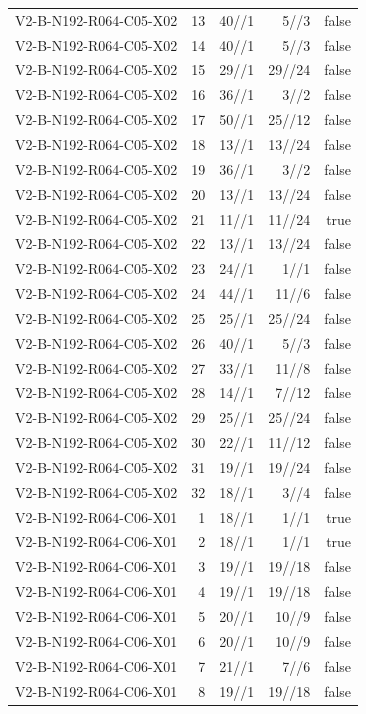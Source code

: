 {\begin{longtable}{lrrrr}
V2-B-N192-R064-C05-X02 & 13 & 40//1 & 5//3 & false \\
V2-B-N192-R064-C05-X02 & 14 & 40//1 & 5//3 & false \\
V2-B-N192-R064-C05-X02 & 15 & 29//1 & 29//24 & false \\
V2-B-N192-R064-C05-X02 & 16 & 36//1 & 3//2 & false \\
V2-B-N192-R064-C05-X02 & 17 & 50//1 & 25//12 & false \\
V2-B-N192-R064-C05-X02 & 18 & 13//1 & 13//24 & false \\
V2-B-N192-R064-C05-X02 & 19 & 36//1 & 3//2 & false \\
V2-B-N192-R064-C05-X02 & 20 & 13//1 & 13//24 & false \\
V2-B-N192-R064-C05-X02 & 21 & 11//1 & 11//24 & true \\
V2-B-N192-R064-C05-X02 & 22 & 13//1 & 13//24 & false \\
V2-B-N192-R064-C05-X02 & 23 & 24//1 & 1//1 & false \\
V2-B-N192-R064-C05-X02 & 24 & 44//1 & 11//6 & false \\
V2-B-N192-R064-C05-X02 & 25 & 25//1 & 25//24 & false \\
V2-B-N192-R064-C05-X02 & 26 & 40//1 & 5//3 & false \\
V2-B-N192-R064-C05-X02 & 27 & 33//1 & 11//8 & false \\
V2-B-N192-R064-C05-X02 & 28 & 14//1 & 7//12 & false \\
V2-B-N192-R064-C05-X02 & 29 & 25//1 & 25//24 & false \\
V2-B-N192-R064-C05-X02 & 30 & 22//1 & 11//12 & false \\
V2-B-N192-R064-C05-X02 & 31 & 19//1 & 19//24 & false \\
V2-B-N192-R064-C05-X02 & 32 & 18//1 & 3//4 & false \\
V2-B-N192-R064-C06-X01 & 1 & 18//1 & 1//1 & true \\
V2-B-N192-R064-C06-X01 & 2 & 18//1 & 1//1 & true \\
V2-B-N192-R064-C06-X01 & 3 & 19//1 & 19//18 & false \\
V2-B-N192-R064-C06-X01 & 4 & 19//1 & 19//18 & false \\
V2-B-N192-R064-C06-X01 & 5 & 20//1 & 10//9 & false \\
V2-B-N192-R064-C06-X01 & 6 & 20//1 & 10//9 & false \\
V2-B-N192-R064-C06-X01 & 7 & 21//1 & 7//6 & false \\
V2-B-N192-R064-C06-X01 & 8 & 19//1 & 19//18 & false \\

\end{longtable}}
